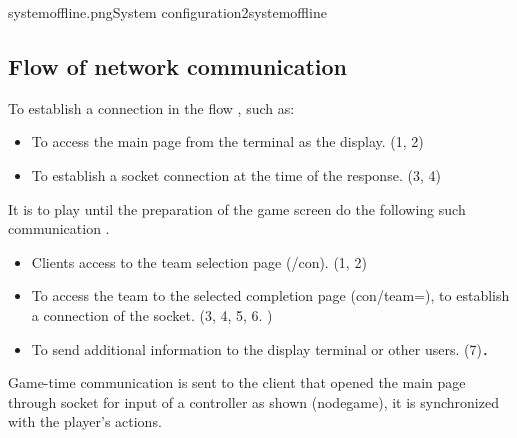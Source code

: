 {systemoffline.png}{System configuration2}{systemoffline}

\subsection{Flow of network communication}
To establish a connection in the flow , such as:
\begin{itemize}
    \item To access the main page from the terminal as the display. (1, 2)
    \item To establish a socket connection at the time of the response. (3, 4)
\end{itemize}

It is to play until the preparation of the game screen do the following such communication .

\begin{itemize}
    \item Clients access to the team selection page (/con). (1, 2)
    \item To access the team to the selected completion page (con/team=), to establish a connection of the socket. (3, 4, 5, 6. )
    \item To send additional information to the display terminal or other users. (7)．
\end{itemize}

Game-time communication is sent to the client that opened the main page through socket for input of a controller as shown \figref(nodegame), it is synchronized with the player's actions.



\newpage

